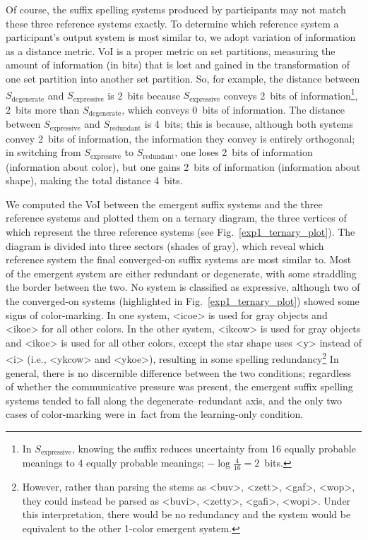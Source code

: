 \documentclass[doc,biblatex]{apa7}
\begin{document}
Of course, the suffix spelling systems produced by participants may not match these three reference systems exactly. To determine which reference system a participant's output system is most similar to, we adopt variation of information \parencite[VoI;][]{Meila:2007} as a distance metric. VoI is a proper metric on set partitions, measuring the amount of information (in bits) that is lost and gained in the transformation of one set partition into another set partition. So, for example, the distance between $S_\mathrm{degenerate}$ and $S_\mathrm{expressive}$ is 2~bits because $S_\mathrm{expressive}$ conveys 2~bits of information\footnote{In $S_\mathrm{expressive}$, knowing the suffix reduces uncertainty from 16 equally probable meanings to 4 equally probable meanings; $-\log\frac{4}{16} = 2$~bits.}, 2~bits more than $S_\mathrm{degenerate}$, which conveys 0~bits of information. The distance between $S_\mathrm{expressive}$ and $S_\mathrm{redundant}$ is 4~bits; this is because, although both systems convey 2~bits of information, the information they convey is entirely orthogonal; in switching from $S_\mathrm{expressive}$ to $S_\mathrm{redundant}$, one loses 2~bits of information (information about color), but one gains 2~bits of information (information about shape), making the total distance 4~bits.

We computed the VoI between the emergent suffix systems and the three reference systems and plotted them on a ternary diagram, the three vertices of which represent the three reference systems (see Fig.~\ref{exp1_ternary_plot}). The diagram is divided into three sectors (shades of gray), which reveal which reference system the final converged-on suffix systems are most similar to. Most of the emergent system are either redundant or degenerate, with some straddling the border between the two. No system is classified as expressive, although two of the converged-on systems (highlighted in Fig.~\ref{exp1_ternary_plot}) showed some signs of color-marking. In one system, <icoe> is used for gray objects and <ikoe> for all other colors. In the other system, <ikcow> is used for gray objects and <ikoe> is used for all other colors, except the star shape uses <y> instead of <i> (i.e., <ykcow> and <ykoe>), resulting in some spelling redundancy\footnote{However, rather than parsing the stems as <buv>, <zett>, <gaf>, <wop>, they could instead be parsed as <buvi>, <zetty>, <gafi>, <wopi>. Under this interpretation, there would be no redundancy and the system would be equivalent to the other 1-color emergent system.} In general, there is no discernible difference between the two conditions; regardless of whether the communicative pressure was present, the emergent suffix spelling systems tended to fall along the degenerate--redundant axis, and the only two cases of color-marking were in~fact from the learning-only condition.
\end{document}

